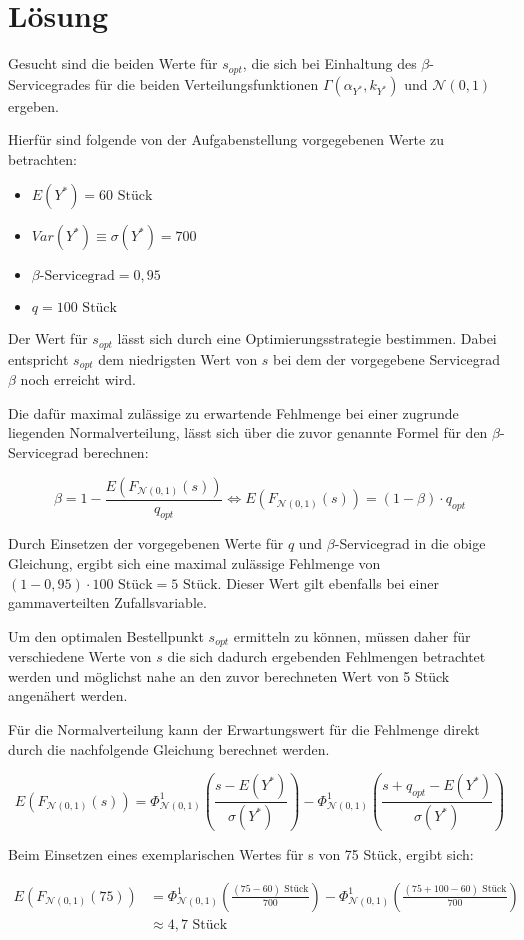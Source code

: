 \section{Lösung}

Gesucht sind die beiden Werte für \(s_{opt}\), die sich bei Einhaltung des \(\beta\)-Servicegrades für die beiden Verteilungsfunktionen \(\Gamma(\alpha_{Y^*},k_{Y^*})\) und \(\mathcal{N}(0,1)\) ergeben.

Hierfür sind folgende von der Aufgabenstellung vorgegebenen Werte zu betrachten:
\begin{itemize}
	\item \(E(Y^*)=60\text{ Stück}\)
	\item \(Var(Y^*)\equiv\sigma(Y^*)=700\)
	\item \(\beta\text{-Servicegrad}=0,95\)
	\item \(q=100\text{ Stück}\) 
\end{itemize}

Der Wert für \(s_{opt}\) lässt sich durch eine Optimierungsstrategie bestimmen. Dabei entspricht \(s_{opt}\) dem niedrigsten Wert von \(s\) bei dem der vorgegebene Servicegrad \(\beta\) noch erreicht wird. 

Die dafür maximal zulässige  zu erwartende Fehlmenge bei einer zugrunde liegenden Normalverteilung, lässt sich über die zuvor genannte Formel für den \(\beta\)-Servicegrad berechnen:

\[\beta = 1-\frac{E\left(F_{\mathcal{N}(0,1)}(s)\right)}{q_{opt}} \Leftrightarrow E\left(F_{\mathcal{N}(0,1)}(s)\right)=(1-\beta)\cdot q_{opt}\]

Durch Einsetzen der vorgegebenen Werte für \(q\) und \(\beta\)-Servicegrad in die obige Gleichung, ergibt sich eine maximal zulässige Fehlmenge von \((1-0,95)\cdot 100 \text{ Stück}=5\text{ Stück}\). Dieser Wert gilt ebenfalls bei einer gammaverteilten Zufallsvariable.

Um den optimalen Bestellpunkt \(s_{opt}\) ermitteln zu können, müssen daher für verschiedene Werte von \(s\) die sich dadurch ergebenden Fehlmengen betrachtet werden und möglichst nahe an den zuvor berechneten Wert von 5 Stück angenähert werden.

Für die Normalverteilung kann der Erwartungswert für die Fehlmenge direkt durch die nachfolgende Gleichung berechnet werden. 

\[E\left(F_{\mathcal{N}(0,1)}(s)\right)=\Phi^1_{\mathcal{N}(0,1)}\left(\frac{s-E(Y^*)}{\sigma(Y^*)}\right)-\Phi^1_{\mathcal{N}(0,1)}\left(\frac{s+q_{opt}-E(Y^*)}{\sigma(Y^*)}\right)\]

Beim Einsetzen eines exemplarischen Wertes für s von 75 Stück, ergibt sich:

\begin{align*}
E\left(F_{\mathcal{N}(0,1)}(75)\right)&=\Phi^1_{\mathcal{N}(0,1)}\left(\frac{(75-60)\text{ Stück}}{700}\right)-\Phi^1_{\mathcal{N}(0,1)}\left(\frac{(75+100-60)\text{ Stück}}{700}\right)\\
&\approx4,7\text{ Stück}
\end{align*}

